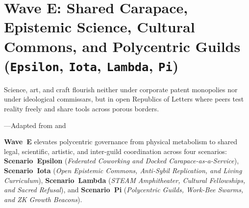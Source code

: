 \chapter{Wave E: Shared Carapace, Epistemic Science, Cultural Commons, and Polycentric Guilds (\texttt{Epsilon}, \texttt{Iota}, \texttt{Lambda}, \texttt{Pi})}
\label{ch:l5-wave-e}

\epigraph{Science, art, and craft flourish neither under corporate patent monopolies nor under ideological commissars, but in open Republics of Letters where peers test reality freely and share tools across porous borders.}{---Adapted from \textcite{ostrom2010} and \textcite{illich1973}}

\textbf{Wave~E} elevates polycentric governance from physical metabolism to shared legal, scientific,
artistic, and inter-guild coordination across four scenarios: \textbf{Scenario~Epsilon}
(\textit{Federated Coworking and Docked Carapace-as-a-Service}), \textbf{Scenario~Iota}
(\textit{Open Epistemic Commons, Anti-Sybil Replication, and Living Curriculum}),
\textbf{Scenario~Lambda} (\textit{STEAM Amphitheater, Cultural Fellowships, and Sacred Refusal}),
and \textbf{Scenario~Pi} (\textit{Polycentric Guilds, Work-Bee Swarms, and ZK Growth Beacons}).

